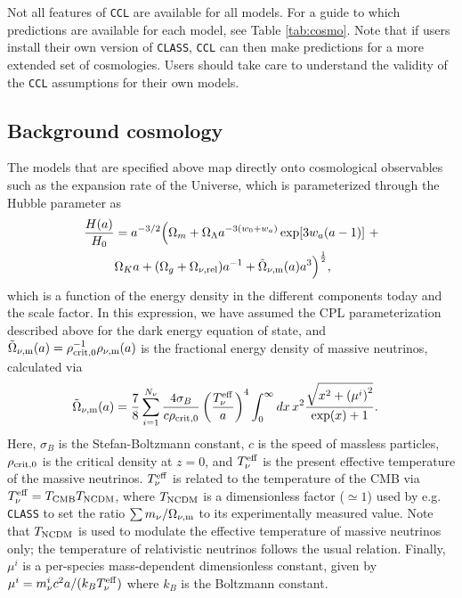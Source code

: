 \documentclass[\docopts]{\docclass}
\newcommand{\ccl}{{\tt CCL}\xspace}
\begin{document}
Not all features of \ccl are available for all models. For a guide to which predictions are available for each model, see Table \ref{tab:cosmo}. Note that if users install their own version of {\tt CLASS}, {\tt CCL} can then make predictions for a more extended set of cosmologies. Users should take care to understand the validity of the {\tt CCL} assumptions for their own models.



\subsection{Background cosmology}

The models that are specified above map directly onto cosmological observables such as the expansion rate of the Universe, which is parameterized through the Hubble parameter as
\begin{align}\label{eq:Ha}
\frac{H(a)}{H_0} &= a^{-3/2}\Big(\Omega_{m}+\Omega_{\Lambda} a^{-3(w_0+w_a)}
    \exp[3 w_a (a-1)]~+ \nonumber \\ &\Omega_{K} a + (\Omega_{g} + \Omega_{\nu, {\rm rel}}) a^{-1} + \tilde\Omega_{\nu, {\rm m}}(a)a^3\Big)^{\frac{1}{2}} ,
\end{align}
which is a function of the energy density in the different components today and the scale factor. In this expression, we have assumed the CPL parameterization described above for the dark energy equation of state, and $\tilde\Omega_{\nu, {\rm m}}(a) = \rho^{-1}_{\rm crit,0} \rho_{\nu, {\rm m}}(a)$ is the fractional energy density of massive neutrinos, calculated via
\begin{align}
\tilde\Omega_{\nu, {\rm m}}(a) &= \frac{7}{8}\sum_{i=1}^{N_\nu} \frac{4 \sigma_{B}}{c \rho_{{\rm crit},0}} \left(\frac{T_{\nu}^{\rm eff}}{a}\right)^4  \int_0^{\infty} dx \, x^2 \frac{\sqrt{x^2 + \left(\mu^i\right)^2}}{\exp(x) + 1}.
\label{Omnu}
\end{align}
Here, $\sigma_B$ is the Stefan-Boltzmann constant, $c$ is the speed of massless particles, $\rho_{{\rm crit},0}$ is the critical density at $z=0$, and $T_{\nu}^{\rm eff}$ is the present effective temperature of the massive neutrinos. $T_{\nu}^{\rm eff}$ is related to the temperature of the CMB via $T_{\nu}^{\rm eff} = T_{\rm CMB} T_{\rm NCDM}$, where $T_{\rm NCDM}$ is a dimensionless factor ($\simeq1$) used by e.g. {\tt CLASS} to set the ratio ${\sum m_\nu}/{\Omega_{\nu, {\rm m}}}$ to its experimentally measured value. Note that $T_{\rm NCDM}$ is used to modulate the effective temperature of massive neutrinos only; the temperature of relativistic neutrinos follows the usual relation. Finally, $\mu^i$ is a per-species mass-dependent dimensionless constant, given by $\mu^i = m_{\nu}^{i}c^2 a / (k_B T_{\nu}^{\rm eff})$ where $k_B$ is the Boltzmann constant.
\end{document}
